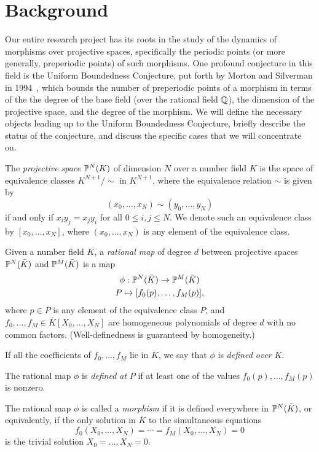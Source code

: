 \section{Background}

Our entire research project has its roots in the study of the dynamics
of morphisms over projective spaces, specifically the periodic points
(or more generally, preperiodic points) of such morphisms. One
profound conjecture in this field is the Uniform Boundedness
Conjecture, put forth by Morton and Silverman in
1994~\cite{MR1264933}, which bounds the number of preperiodic points
of a morphism in terms of the the degree of the base field (over the
rational field $\Q$), the dimension of the projective space, and the
degree of the morphism. We will define the necessary objects leading
up to the Uniform Boundedness Conjecture, briefly describe the status
of the conjecture, and discuss the specific cases that we will
concentrate on.

\begin{definition}
  The \emph{projective space} $\P^N(K)$ of dimension $N$ over a number
  field $K$ is the space of equivalence classes $K^{N+1}/\sim$ in
  $K^{N+1}$, where the equivalence relation $\sim$ is given by
  \[
  (x_0, \dots, x_N) \sim (y_0, \dots, y_N)
  \]
  if and only if $x_i y_j = x_j y_i$ for all $0 \le i, j \le N$. We
  denote such an equivalence class by $[x_0, \dots, x_N]$, where
  $(x_0, \dots, x_N)$ is any element of the equivalence class.
\end{definition}

\begin{definition}
  Given a number field $K$, a \emph{rational map} of degree $d$
  between projective spaces $\P^N(\bar{K})$ and $\P^M(\bar{K})$ is a
  map
  \[
  \begin{gathered}
    \phi: \P^N(\bar{K}) \to \P^M(\bar{K})\\
    P \mapsto [f_0(p), \dots, f_M(p)],
  \end{gathered}
  \]
  where $p \in P$ is any element of the equivalence class $P$, and
  $f_0, \dots, f_M \in \bar{K}[X_0, \dots, X_N]$ are homogeneous
  polynomials of degree $d$ with no common factors. (Well-definedness
  is guaranteed by homogeneity.)

  If all the coefficients of $f_0, \dots, f_M$ lie in $K$, we say that $\phi$ is \emph{defined over} $K$.

  The rational map $\phi$ is \emph{defined at} $P$ if at least one of
  the values $f_0(p), \dots, f_M(p)$ is nonzero.

  The rational map $\phi$ is called a \emph{morphism} if it is defined
  everywhere in $\P^N(\bar{K})$, or equivalently, if the only solution
  in $\bar{K}$ to the simultaneous equations
  \[
  f_0(X_0, \dots, X_N) = \cdots = f_M(X_0, \dots, X_N) = 0
  \]
  is the trivial solution $X_0 = \dots, X_N = 0$.
\end{definition}

